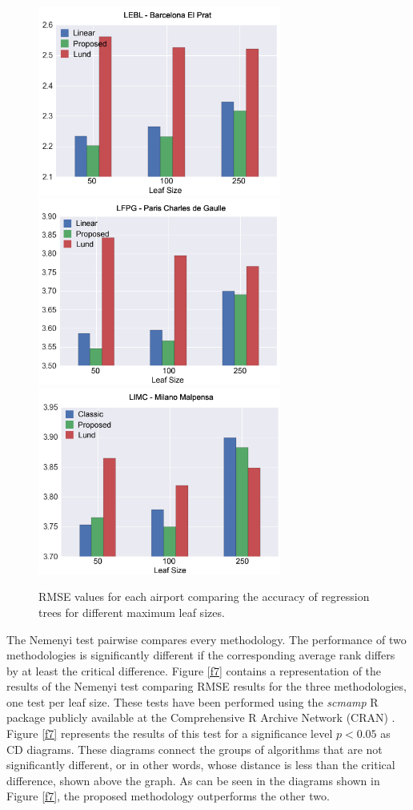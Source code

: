 \documentclass[times,twocolumn,final,authoryear]{elsarticle}
\begin{document}
\begin{figure}
  \includegraphics[width=8cm]{barcelona.png}
  \includegraphics[width=8cm]{charles.png}
  \includegraphics[width=8cm]{milan.png}
\caption{RMSE values for each airport comparing the accuracy of regression trees for different maximum leaf sizes.}
\label{f6}
\end{figure}

The Nemenyi test pairwise compares every methodology. The performance of two methodologies is significantly different if the corresponding average rank differs by at least the critical difference. Figure \ref{f7} contains a representation of the results of the Nemenyi test comparing RMSE results for the three methodologies, one test per leaf size. These tests have been performed using the \textit{scmamp} R package publicly available at the Comprehensive R Archive Network (CRAN) \citep{Calvo2015}. Figure \ref{f7} represents the results of this test for a significance level $ p < 0.05 $ as CD diagrams.  These diagrams connect the groups of algorithms that are not significantly different, or in other words, whose distance is less than the critical difference, shown above the graph. As can be seen in the diagrams shown in Figure \ref{f7}, the proposed methodology outperforms the other two.
\end{document}
